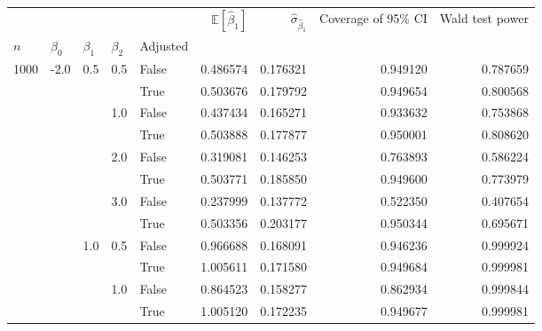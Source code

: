 \begin{tabular}{lllllrrrr}
\toprule
     &      &     &     &       &  $\mathbb{E}\left[\hat\beta_1\right]$ &  $\hat\sigma_{\hat\beta_1}$ &  Coverage of 95\% CI &  Wald test power \\
$n$ & $\beta_0$ & $\beta_1$ & $\beta_2$ & Adjusted &                                       &                             &                      &                  \\
\midrule
1000 & -2.0 & 0.5 & 0.5 & False &                              0.486574 &                    0.176321 &             0.949120 &         0.787659 \\
     &      &     &     & True  &                              0.503676 &                    0.179792 &             0.949654 &         0.800568 \\
     &      &     & 1.0 & False &                              0.437434 &                    0.165271 &             0.933632 &         0.753868 \\
     &      &     &     & True  &                              0.503888 &                    0.177877 &             0.950001 &         0.808620 \\
     &      &     & 2.0 & False &                              0.319081 &                    0.146253 &             0.763893 &         0.586224 \\
     &      &     &     & True  &                              0.503771 &                    0.185850 &             0.949600 &         0.773979 \\
     &      &     & 3.0 & False &                              0.237999 &                    0.137772 &             0.522350 &         0.407654 \\
     &      &     &     & True  &                              0.503356 &                    0.203177 &             0.950344 &         0.695671 \\
     &      & 1.0 & 0.5 & False &                              0.966688 &                    0.168091 &             0.946236 &         0.999924 \\
     &      &     &     & True  &                              1.005611 &                    0.171580 &             0.949684 &         0.999981 \\
     &      &     & 1.0 & False &                              0.864523 &                    0.158277 &             0.862934 &         0.999844 \\
     &      &     &     & True  &                              1.005120 &                    0.172235 &             0.949677 &         0.999981 \\

\end{tabular}
